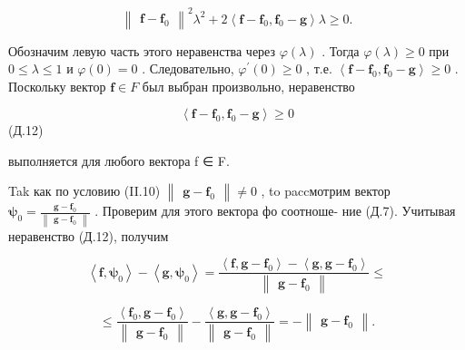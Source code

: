 \documentclass[8pt]{extarticle}
\begin{document}
\[
{\left\lVert \begin{array}{c} \mathbf{f} - {\mathbf{f}}_{0} \end{array} \right\rVert}^{2}{\lambda }^{2} + 2\left\langle  {\mathbf{f} - {\mathbf{f}}_{0},{\mathbf{f}}_{0} - \mathbf{g}}\right\rangle  \lambda  \geq  0.
\]

Обозначим левую часть этого неравенства через \(\varphi \left( \lambda \right)\) . Тогда \(\varphi \left( \lambda \right)  \geq  0\) при \(0 \leq  \lambda  \leq  1\) и \(\varphi \left( 0\right)  = 0\) . Следовательно, \({\varphi }^{\prime }\left( 0\right)  \geq  0\) , т.е. \(\left\langle  {\mathbf{f} - {\mathbf{f}}_{0},{\mathbf{f}}_{0} - \mathbf{g}}\right\rangle   \geq  0\) . Поскольку вектор \(\mathbf{f} \in  F\) был выбран произвольно, неравенство

\[
\left\langle  {\mathbf{f} - {\mathbf{f}}_{0},{\mathbf{f}}_{0} - \mathbf{g}}\right\rangle   \geq  0
\]
 (Д.12)

выполняется для любого вектора f ∈ F.

Tak как по условию (II.10) \(\left\lVert \begin{array}{c} {\mathbf{g} - {\mathbf{f}}_{0}} \end{array} \right\rVert \neq  0\) , to paccмотрим вектор \({\mathbf{\psi }}_{0} = \frac{\mathbf{g} - {\mathbf{f}}_{0}}{\left\lVert \begin{array}{c} \mathbf{g} - {\mathbf{f}}_{0} \end{array} \right\rVert}\) . Проверим для этого вектора фо соотноше- ние (Д.7). Учитывая неравенство (Д.12), получим

\[
\left\langle  {\mathbf{f},{\mathbf{\psi }}_{0}}\right\rangle   - \left\langle  {\mathbf{g},{\mathbf{\psi }}_{0}}\right\rangle   = \frac{\left\langle  {\mathbf{f},\mathbf{g} - {\mathbf{f}}_{0}}\right\rangle   - \left\langle  {\mathbf{g},\mathbf{g} - {\mathbf{f}}_{0}}\right\rangle  }{\left\lVert \begin{array}{c} \mathbf{g} - {\mathbf{f}}_{0} \end{array} \right\rVert} \leq
\]

\[
\leq  \frac{\left\langle  {\mathbf{f}}_{0},\mathbf{g} - {\mathbf{f}}_{0}\right\rangle  }{\left\lVert \begin{array}{c} \mathbf{g} - {\mathbf{f}}_{0} \end{array} \right\rVert} - \frac{\left\langle  \mathbf{g},\mathbf{g} - {\mathbf{f}}_{0}\right\rangle  }{\left\lVert \begin{array}{c} \mathbf{g} - {\mathbf{f}}_{0} \end{array} \right\rVert} =  - \left\lVert \begin{array}{c} {\mathbf{g} - {\mathbf{f}}_{0}} \end{array} \right\rVert.
\]
\end{document}
